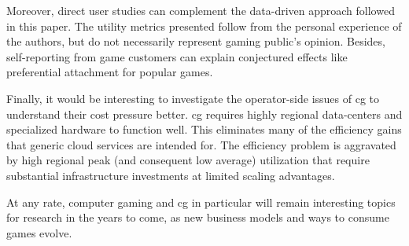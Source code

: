 Moreover, direct user studies can complement the data-driven
approach followed in this paper. The utility metrics presented
follow from the personal experience of the authors, but do not
necessarily represent gaming public's opinion. Besides, self-reporting
from game customers can explain conjectured effects like preferential
attachment for popular games.

Finally, it would be interesting to investigate the operator-side
issues of \gls{cg} to understand their cost pressure better.
\Gls{cg} requires highly regional data-centers and specialized
hardware to function well. This eliminates many of the efficiency
gains that generic cloud services are intended for.
The efficiency problem is aggravated by high regional peak
(and consequent low average) utilization that require substantial
infrastructure investments at limited scaling advantages.

At any rate, computer gaming and \gls{cg} in particular will
remain interesting topics for research in the years to come,
as new business models and ways to consume games evolve.
